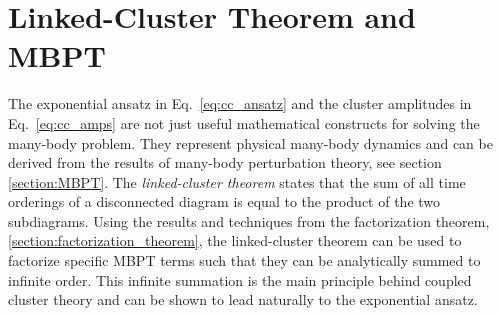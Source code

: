 \documentclass[thesis.tex]{subfiles}
\begin{document}
\section{Linked-Cluster Theorem and MBPT} \label{section:linkedcluster}

The exponential ansatz in Eq.\ \eqref{eq:cc_ansatz} and the cluster amplitudes in Eq.\ \eqref{eq:cc_amps} are not just useful mathematical constructs for solving the many-body problem. They represent physical many-body dynamics and can be derived from the results of many-body perturbation theory, see section \ref{section:MBPT}.  The \textit{linked-cluster theorem} \cite{HUGENHOLTZ1957481,FRANTZ196016,BRANDOW1967} states that the sum of all time orderings of a disconnected diagram is equal to the product of the two subdiagrams.  Using the results and techniques from the factorization theorem, \ref{section:factorization_theorem}, the linked-cluster theorem can be used to factorize specific MBPT terms such that they can be analytically summed to infinite order.  This infinite summation is the main principle behind coupled cluster theory and can be shown to lead naturally to the exponential ansatz.
\end{document}
